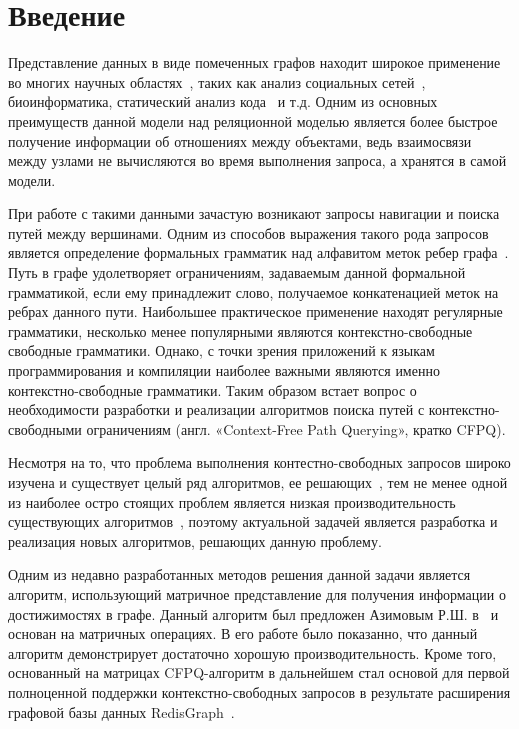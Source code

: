 \section*{Введение}\label{sec:introduction}

Представление данных в виде помеченных графов находит широкое применение во многих научных областях~\cite{robinson2015graph}, таких как анализ социальных сетей~\cite{10.1145/2463664.2465216}, биоинформатика\cite{rna}, статический анализ кода~\cite{10.1145/2499370.2462159} и т.д.
Одним из основных преимуществ данной модели над реляционной моделью является более быстрое получение информации об отношениях между объектами, ведь взаимосвязи между узлами не вычисляются во время выполнения запроса, а хранятся в самой модели.

При работе с такими данными зачастую возникают запросы навигации и поиска путей между вершинами. 
Одним из способов выражения такого рода запросов является определение формальных грамматик над алфавитом меток ребер графа~\cite{cfpqs}.
Путь в графе удолетворяет ограничениям, задаваемым данной формальной грамматикой, если ему принадлежит слово, получаемое конкатенацией меток на ребрах данного пути.
Наибольшее практическое применение находят регулярные грамматики, несколько менее популярными являются контекстно-свободные свободные грамматики. Однако, с точки зрения приложений к языкам программирования и компиляции наиболее важными являются именно контекстно-свободные грамматики. Таким образом встает вопрос о необходимости разработки и реализации алгоритмов поиска путей с контекстно-свободными ограничениям (англ. «Context-Free Path Querying», кратко CFPQ).

Несмотря на то, что проблема выполнения контестно-свободных запросов широко изучена и существует целый ряд алгоритмов, ее решающих~\cite{10.1145/3210259.3210264, zhang2016contextfree, hellings2016querying, medeiros2020algorithm}, тем не менее одной из наиболее остро стоящих проблем является низкая производительность существующих алгоритмов~\cite{10.1145/3335783.3335791}, поэтому актуальной задачей является разработка и реализация новых алгоритмов, решающих данную проблему.

Одним из недавно разработанных методов решения данной задачи является алгоритм, использующий матричное представление для получения информации о достижимостях в графе. Данный алгоритм был предложен Азимовым Р.Ш. в~\cite{10.1145/3398682.3399163} и основан на матричных операциях. 
В его работе было показанно, что данный алгоритм демонстрирует достаточно хорошую производительность. Кроме того, основанный на матрицах CFPQ-алгоритм в дальнейшем стал основой для первой полноценной поддержки контекстно-свободных запросов в результате расширения графовой базы данных RedisGraph~\cite{MultipleSource}.

